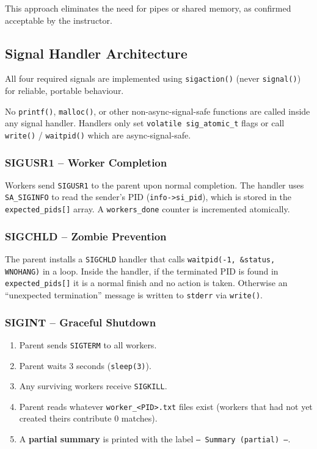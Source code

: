\documentclass[12pt,a4paper]{article}
\begin{document}
This approach eliminates the need for pipes or shared memory, as confirmed
acceptable by the instructor.

\subsection{Signal Handler Architecture}

All four required signals are implemented using \texttt{sigaction()} (never
\texttt{signal()}) for reliable, portable behaviour.

\begin{warnbox}
No \texttt{printf()}, \texttt{malloc()}, or other non-async-signal-safe
functions are called inside any signal handler. Handlers only set
\texttt{volatile sig\_atomic\_t} flags or call \texttt{write()} /
\texttt{waitpid()} which are async-signal-safe.
\end{warnbox}

\subsubsection{SIGUSR1 -- Worker Completion}

Workers send \texttt{SIGUSR1} to the parent upon normal completion.
The handler uses \texttt{SA\_SIGINFO} to read the sender's PID
(\texttt{info->si\_pid}), which is stored in the \texttt{expected\_pids[]}
array. A \texttt{workers\_done} counter is incremented atomically.

\subsubsection{SIGCHLD -- Zombie Prevention}

The parent installs a \texttt{SIGCHLD} handler that calls
\texttt{waitpid(-1, \&status, WNOHANG)} in a loop. Inside the handler, if the
terminated PID is found in \texttt{expected\_pids[]} it is a normal finish and
no action is taken. Otherwise an ``unexpected termination'' message is written
to \texttt{stderr} via \texttt{write()}.

\subsubsection{SIGINT -- Graceful Shutdown}

\begin{enumerate}
    \item Parent sends \texttt{SIGTERM} to all workers.
    \item Parent waits 3 seconds (\texttt{sleep(3)}).
    \item Any surviving workers receive \texttt{SIGKILL}.
    \item Parent reads whatever \texttt{worker\_<PID>.txt} files exist
          (workers that had not yet created theirs contribute 0 matches).
    \item A \textbf{partial summary} is printed with the label
          \texttt{--- Summary (partial) ---}.
\end{enumerate}
\end{document}
